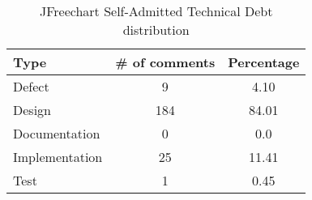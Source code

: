 \begin{table*}[!hbt]
      \begin{center}
            \caption{JFreechart Self-Admitted Technical Debt distribution}
            \label{tab:jfreechart_td_details}
            \begin{tabular}{l| c c }
            \toprule
            \textbf{Type}   & \textbf{\# of comments}     & \textbf{Percentage}  \\ \midrule 
             Defect          &  9              &4.10 \\     
             Design          &  184            &84.01 \\    
             Documentation   &  0              & 0.0\\      
             Implementation  &  25             & 11.41\\    
             Test            &  1              & 0.45\\  \bottomrule                                   
            \end{tabular}
      \end{center}
\end{table*}

